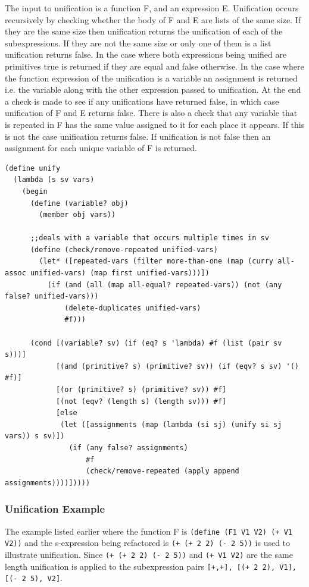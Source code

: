 \documentclass[a4paper,10pt]{article}
\begin{document}
The input to unification is a function F, and an expression E.  Unification occurs recursively by checking whether the body of F and E are lists of the same size.  If they are the same size then unification returns the unification of each of the subexpressions.  If they are not the same size or only one of them is a list unification returns false.  In the case where both expressions being unified are primitives true is returned if they are equal and false otherwise.  In the case where the function expression of the unification is a variable an assignment is returned i.e. the variable along with the other expression passed to unification.  At the end a check is made to see if any unifications have returned false, in which case unification of F and E returns false.  There is also a check that any variable that is repeated in F has the same value assigned to it for each place it appears.  If this is not the case unification returns false. If unification is not false then an assignment for each unique variable of F is returned.

\begin{lstlisting}[frame=trBL]
(define unify
  (lambda (s sv vars)
    (begin
      (define (variable? obj)
        (member obj vars))

      ;;deals with a variable that occurs multiple times in sv
      (define (check/remove-repeated unified-vars)
        (let* ([repeated-vars (filter more-than-one (map (curry all-assoc unified-vars) (map first unified-vars)))])
          (if (and (all (map all-equal? repeated-vars)) (not (any false? unified-vars)))
              (delete-duplicates unified-vars)
              #f)))
      
      (cond [(variable? sv) (if (eq? s 'lambda) #f (list (pair sv s)))]
            [(and (primitive? s) (primitive? sv)) (if (eqv? s sv) '() #f)]
            [(or (primitive? s) (primitive? sv)) #f]
            [(not (eqv? (length s) (length sv))) #f]
            [else
             (let ([assignments (map (lambda (si sj) (unify si sj vars)) s sv)])
               (if (any false? assignments)
                   #f
                   (check/remove-repeated (apply append assignments))))]))))
\end{lstlisting}
\subsubsection{Unification Example}
The example listed earlier where the function F is \texttt{(define (F1 V1 V2) (+ V1 V2))} and the s-expression being refactored is \texttt{(+ (+ 2 2) (- 2 5))} is used to illustrate unification.  Since \texttt{(+ (+ 2 2) (- 2 5))} and \texttt{(+ V1 V2)} are the same length unification is applied to the subexpression pairs \texttt{[+,+], [(+ 2 2), V1], [(- 2 5), V2]}.
\end{document}

